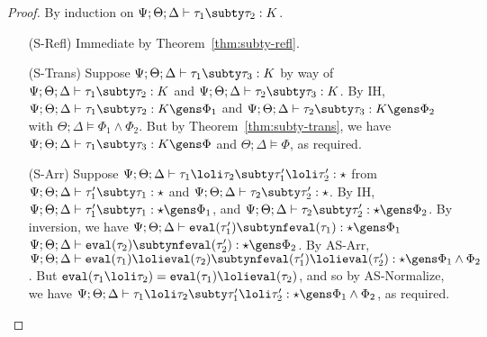 \begin{proof}
By induction on $\Psi ; \Theta ; \Delta \vdash \tau_1 \subty \tau_2 : K$.
 \begin{itemize}
   \item[(S-Refl)] Immediate by Theorem~\ref{thm:subty-refl}.
   \item[(S-Trans)] Suppose $\Psi ; \Theta ; \Delta \vdash \tau_1 \subty \tau_3 : K$ by way of $\Psi ; \Theta ; \Delta \vdash \tau_1 \subty \tau_2 : K$ and $\Psi ; \Theta ; \Delta \vdash \tau_2 \subty \tau_3 : K$. By IH, $\Psi ; \Theta ; \Delta \vdash \tau_1 \subty \tau_2 : K \gens \Phi_1$ and $\Psi ; \Theta ; \Delta \vdash \tau_2 \subty \tau_3 : K \gens \Phi_2$ with $\Theta ; \Delta \vDash \Phi_1 \wedge \Phi_2$. But by Theorem~\ref{thm:subty-trans}, we have
   $\Psi ; \Theta ; \Delta \vdash \tau_1 \subty \tau_3 : K \gens \Phi$ and $\Theta ; \Delta \vDash \Phi$, as required.
   \item[(S-Arr)] Suppose $\Psi ; \Theta ; \Delta \vdash \tau_1 \loli \tau_2 \subty \tau_1' \loli \tau_2' : \star$
   from $\Psi ; \Theta ; \Delta \vdash \tau_1' \subty \tau_1 : \star$ and
   $\Psi ; \Theta ; \Delta \vdash \tau_2 \subty \tau_2' : \star$.
   By IH, $\Psi ; \Theta ; \Delta \vdash \tau_1' \subty \tau_1 : \star \gens \Phi_1$,
   and $\Psi ; \Theta ; \Delta \vdash \tau_2 \subty \tau_2' : \star \gens \Phi_2$.
   By inversion, we have $\Psi ; \Theta ; \Delta \vdash \texttt{eval}(\tau_1') \subtynf \texttt{eval}(\tau_1) : \star \gens \Phi_1$
   $\Psi ; \Theta ; \Delta \vdash \texttt{eval}(\tau_2) \subtynf \texttt{eval}(\tau_2') : \star \gens \Phi_2$.
   By AS-Arr,
   $\Psi ; \Theta ; \Delta \vdash \texttt{eval}(\tau_1) \loli \texttt{eval}(\tau_2) \subtynf \texttt{eval}(\tau_1') \loli \texttt{eval}(\tau_2') : \star \gens \Phi_1 \wedge \Phi_2$. But $\texttt{eval}(\tau_1 \loli \tau_2) = \texttt{eval}(\tau_1) \loli \texttt{eval}(\tau_2)$, and so by AS-Normalize, we have
   $\Psi ; \Theta ; \Delta \vdash \tau_1 \loli \tau_2 \subty \tau_1' \loli \tau_2' : \star \gens \Phi_1 \wedge \Phi_2$, as required.
   

\end{itemize}
\end{proof}
